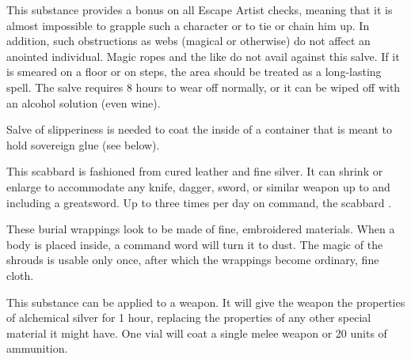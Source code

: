 {

 This substance provides a   bonus on all Escape Artist checks, meaning that it is almost impossible to grapple such a character or to tie or chain him up. In addition, such obstructions as webs (magical or otherwise) do not affect an anointed individual. Magic ropes and the like do not avail against this salve. If it is smeared on a floor or on steps, the area should be treated as a long-lasting  spell. The salve requires 8 hours to wear off normally, or it can be wiped off with an alcohol solution (even wine).

Salve of slipperiness is needed to coat the inside of a container that is meant to hold sovereign glue (see below).


 This scabbard is fashioned from cured leather and fine silver. It can shrink or enlarge to accommodate any knife, dagger, sword, or similar weapon up to and including a greatsword. Up to three times per day on command, the scabbard .


 These burial wrappings look to be made of fine, embroidered materials. When a body is placed inside, a command word will turn it to dust. The magic of the shrouds is usable only once, after which the wrappings become ordinary, fine cloth.


 This substance can be applied to a weapon. It will give the weapon the properties of alchemical silver for 1 hour, replacing the properties of any other special material it might have. One vial will coat a single melee weapon or 20 units of ammunition.

}
